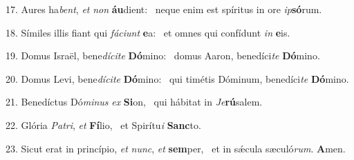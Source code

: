 17. Aures ha\textit{bent}, \textit{et} \textit{non} \textbf{áu}dient: \ast\  neque enim est spíritus in ore \textit{ip}\textbf{só}rum.\

18. Símiles illis fiant qui \textit{fá}\textit{ci}\textit{unt} \textbf{e}a: \ast\  et omnes qui confídunt \textit{in} \textbf{e}is.\

19. Domus Israël, bene\textit{dí}\textit{ci}\textit{te} \textbf{Dó}mino: \ast\  domus Aaron, benedíci\textit{te} \textbf{Dó}mino.\

20. Domus Levi, bene\textit{dí}\textit{ci}\textit{te} \textbf{Dó}mino: \ast\  qui timétis Dóminum, benedíci\textit{te} \textbf{Dó}mino.\

21. Benedíctus Dó\textit{mi}\textit{nus} \textit{ex} \textbf{Si}on, \ast\  qui hábitat in \textit{Je}\textbf{rú}salem.\

22. Glória \textit{Pa}\textit{tri}, \textit{et} \textbf{Fí}lio, \ast\  et Spirítu\textit{i} \textbf{Sanc}to.\

23. Sicut erat in princípio, \textit{et} \textit{nunc}, \textit{et} \textbf{sem}per, \ast\  et in sǽcula sæculó\textit{rum}. \textbf{A}men.\

